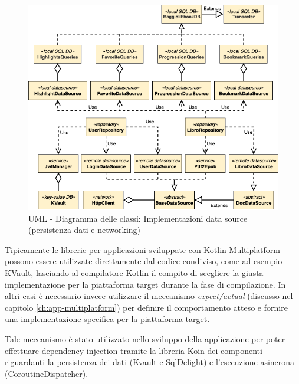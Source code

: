 \begin{figure}[H]
    \centering
    \includegraphics[width=1\textwidth]{img/uml-network-db.png}
    \caption{UML - Diagramma delle classi: Implementazioni data source (persistenza dati e networking)}
\end{figure}

Tipicamente le librerie per applicazioni sviluppate con Kotlin Multiplatform possono essere utilizzate direttamente dal codice condiviso, come ad esempio KVault, lasciando al compilatore Kotlin il compito di scegliere la giusta implementazione per la piattaforma target durante la fase di compilazione. In altri casi è necessario invece utilizzare il meccanismo \textit{expect/actual} (discusso nel capitolo \ref{ch:app-multiplatform}) per definire il comportamento atteso e fornire una implementazione specifica per la piattaforma target.

Tale meccanismo è stato utilizzato nello sviluppo della applicazione per poter effettuare dependency injection tramite la libreria Koin dei componenti riguardanti la persistenza dei dati (Kvault e SqlDelight) e l'esecuzione asincrona (CoroutineDispatcher).


